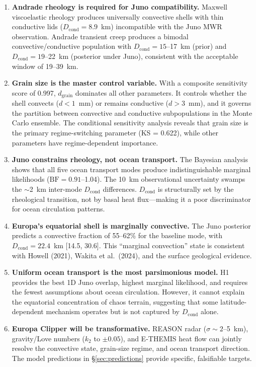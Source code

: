 \documentclass[11pt,letterpaper]{article}
\begin{document}
\begin{summarybox}
\begin{enumerate}
  \item \textbf{Andrade rheology is required for Juno compatibility.} Maxwell viscoelastic rheology produces universally convective shells with thin conductive lids ($D_\mathrm{cond} = 8.9$~km) incompatible with the Juno MWR observation. Andrade transient creep produces a bimodal convective/conductive population with $D_\mathrm{cond} = 15$--17~km (prior) and $D_\mathrm{cond} = 19$--22~km (posterior under Juno), consistent with the acceptable window of 19--39~km.

  \item \textbf{Grain size is the master control variable.} With a composite sensitivity score of 0.997, $d_\mathrm{grain}$ dominates all other parameters. It controls whether the shell convects ($d < 1$~mm) or remains conductive ($d > 3$~mm), and it governs the partition between convective and conductive subpopulations in the Monte Carlo ensemble. The conditional sensitivity analysis reveals that grain size is the primary regime-switching parameter (KS = 0.622), while other parameters have regime-dependent importance.

  \item \textbf{Juno constrains rheology, not ocean transport.} The Bayesian analysis shows that all five ocean transport modes produce indistinguishable marginal likelihoods ($\mathrm{BF} = 0.91$--1.04). The 10~km observational uncertainty swamps the $\sim$2~km inter-mode $D_\mathrm{cond}$ differences. $D_\mathrm{cond}$ is structurally set by the rheological transition, not by basal heat flux---making it a poor discriminator for ocean circulation patterns.

  \item \textbf{Europa's equatorial shell is marginally convective.} The Juno posterior predicts a convective fraction of 55--62\% for the baseline mode, with $D_\mathrm{cond} = 22.4$~km [14.5, 30.6]. This ``marginal convection'' state is consistent with Howell (2021), Wakita et al.\ (2024), and the surface geological evidence.

  \item \textbf{Uniform ocean transport is the most parsimonious model.} H1 provides the best 1D Juno overlap, highest marginal likelihood, and requires the fewest assumptions about ocean circulation. However, it cannot explain the equatorial concentration of chaos terrain, suggesting that some latitude-dependent mechanism operates but is not captured by $D_\mathrm{cond}$ alone.

  \item \textbf{Europa Clipper will be transformative.} REASON radar ($\sigma \sim 2$--5~km), gravity/Love numbers ($k_2$ to $\pm 0.05$), and E-THEMIS heat flow can jointly resolve the convective state, grain-size regime, and ocean transport direction. The model predictions in \S\ref{sec:predictions} provide specific, falsifiable targets.
\end{enumerate}
\end{summarybox}
\end{document}
